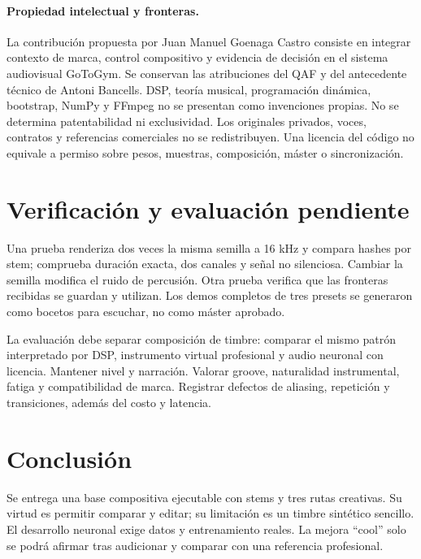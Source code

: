 \documentclass[11pt,a4paper]{article}
\begin{document}
\newpage
\paragraph{Propiedad intelectual y fronteras.}
La contribución propuesta por Juan Manuel Goenaga Castro consiste en integrar contexto de marca, control compositivo y evidencia de decisión en el sistema audiovisual GoToGym. Se conservan las atribuciones del QAF y del antecedente técnico de Antoni Bancells. DSP, teoría musical, programación dinámica, bootstrap, NumPy y FFmpeg no se presentan como invenciones propias. No se determina patentabilidad ni exclusividad. Los originales privados, voces, contratos y referencias comerciales no se redistribuyen. Una licencia del código no equivale a permiso sobre pesos, muestras, composición, máster o sincronización.
\section{Verificación y evaluación pendiente}
Una prueba renderiza dos veces la misma semilla a 16 kHz y compara hashes por stem; comprueba duración exacta, dos canales y señal no silenciosa. Cambiar la semilla modifica el ruido de percusión. Otra prueba verifica que las fronteras recibidas se guardan y utilizan. Los demos completos de tres presets se generaron como bocetos para escuchar, no como máster aprobado.

La evaluación debe separar composición de timbre: comparar el mismo patrón interpretado por DSP, instrumento virtual profesional y audio neuronal con licencia. Mantener nivel y narración. Valorar groove, naturalidad instrumental, fatiga y compatibilidad de marca. Registrar defectos de aliasing, repetición y transiciones, además del costo y latencia.

\section{Conclusión}
Se entrega una base compositiva ejecutable con stems y tres rutas creativas. Su virtud es permitir comparar y editar; su limitación es un timbre sintético sencillo. El desarrollo neuronal exige datos y entrenamiento reales. La mejora ``cool'' solo se podrá afirmar tras audicionar y comparar con una referencia profesional.
\end{document}
